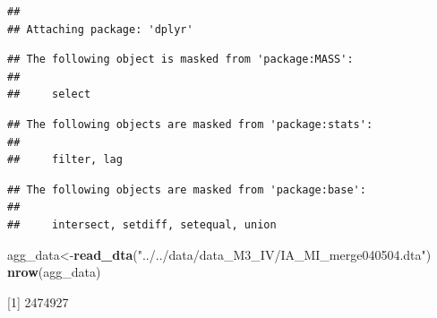 \documentclass[
]{article}
\newenvironment{Shaded}{\begin{snugshade}}{\end{snugshade}}
\newcommand{\CommentTok}[1]{\textcolor[rgb]{0.56,0.35,0.01}{\textit{#1}}}
\newcommand{\DecValTok}[1]{\textcolor[rgb]{0.00,0.00,0.81}{#1}}
\newcommand{\KeywordTok}[1]{\textcolor[rgb]{0.13,0.29,0.53}{\textbf{#1}}}
\newcommand{\NormalTok}[1]{#1}
\newcommand{\OperatorTok}[1]{\textcolor[rgb]{0.81,0.36,0.00}{\textbf{#1}}}
\newcommand{\StringTok}[1]{\textcolor[rgb]{0.31,0.60,0.02}{#1}}
\begin{document}
\begin{verbatim}
## 
## Attaching package: 'dplyr'
\end{verbatim}

\begin{verbatim}
## The following object is masked from 'package:MASS':
## 
##     select
\end{verbatim}

\begin{verbatim}
## The following objects are masked from 'package:stats':
## 
##     filter, lag
\end{verbatim}

\begin{verbatim}
## The following objects are masked from 'package:base':
## 
##     intersect, setdiff, setequal, union
\end{verbatim}

\begin{Shaded}
\begin{Highlighting}[]
\NormalTok{agg\_data\textless{}{-}}\KeywordTok{read\_dta}\NormalTok{(}\StringTok{"../../data/data\_M3\_IV/IA\_MI\_merge040504.dta"}\NormalTok{)}
\KeywordTok{nrow}\NormalTok{(agg\_data)}
\end{Highlighting}
\end{Shaded}

{[}1{]} 2474927

\begin{Shaded}
\end{Shaded}
\end{document}
